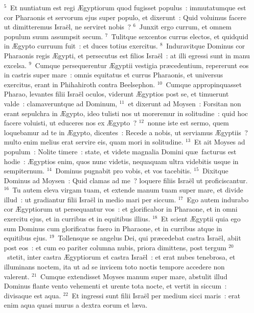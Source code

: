 ${}^{5}$~Et nuntiatum est regi \AE gyptiorum quod fugisset populus~: immutatumque est cor Pharaonis et servorum ejus super populo, et dixerunt~: Quid voluimus facere ut dimitteremus Isra\"el, ne serviret nobis~?
${}^{6}$~Junxit ergo currum, et omnem populum suum assumpsit secum.
${}^{7}$~Tulitque sexcentos currus electos, et quidquid in \AE gypto curruum fuit~: et duces totius exercitus.
${}^{8}$~Induravitque Dominus cor Pharaonis regis \AE gypti, et persecutus est filios Isra\"el~: at illi egressi sunt in manu excelsa.
${}^{9}$~Cumque persequerentur \AE gyptii vestigia pr\ae cedentium, repererunt eos in castris super mare~: omnis equitatus et currus Pharaonis, et universus exercitus, erant in Phihahiroth contra Beelsephon.
${}^{10}$~Cumque appropinquasset Pharao, levantes filii Isra\"el oculos, viderunt \AE gyptios post se, et timuerunt valde~: clamaveruntque ad Dominum,
${}^{11}$~et dixerunt ad Moysen~: Forsitan non erant sepulchra in \AE gypto, ideo tulisti nos ut moreremur in solitudine~: quid hoc facere voluisti, ut educeres nos ex \AE gypto~?
${}^{12}$~nonne iste est sermo, quem loquebamur ad te in \AE gypto, dicentes~: Recede a nobis, ut serviamus \AE gyptiis~? multo enim melius erat servire eis, quam mori in solitudine.
${}^{13}$~Et ait Moyses ad populum~: Nolite timere~: state, et videte magnalia Domini qu\ae\ facturus est hodie~: \AE gyptios enim, quos nunc videtis, nequaquam ultra videbitis usque in sempiternum.
${}^{14}$~Dominus pugnabit pro vobis, et vos tacebitis.
${}^{15}$~Dixitque Dominus ad Moysen~: Quid clamas ad me~? loquere filiis Isra\"el ut proficiscantur.
${}^{16}$~Tu autem eleva virgam tuam, et extende manum tuam super mare, et divide illud~: ut gradiantur filii Isra\"el in medio mari per siccum.
${}^{17}$~Ego autem indurabo cor \AE gyptiorum ut persequantur vos~: et glorificabor in Pharaone, et in omni exercitu ejus, et in curribus et in equitibus illius.
${}^{18}$~Et scient \AE gyptii quia ego sum Dominus cum glorificatus fuero in Pharaone, et in curribus atque in equitibus ejus.
${}^{19}$~Tollensque se angelus Dei, qui pr\ae cedebat castra Isra\"el, abiit post eos~: et cum eo pariter columna nubis, priora dimittens, post tergum
${}^{20}$~stetit, inter castra \AE gyptiorum et castra Isra\"el~: et erat nubes tenebrosa, et illuminans noctem, ita ut ad se invicem toto noctis tempore accedere non valerent.
${}^{21}$~Cumque extendisset Moyses manum super mare, abstulit illud Dominus flante vento vehementi et urente tota nocte, et vertit in siccum~: divisaque est aqua.
${}^{22}$~Et ingressi sunt filii Isra\"el per medium sicci maris~: erat enim aqua quasi murus a dextra eorum et l\ae va.
